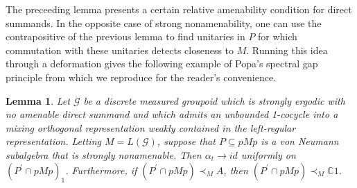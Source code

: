\documentclass[a4paper,11pt]{article}
\numberwithin{equation}{section}
\newtheorem{lem}[thm]{Lemma}
\theoremstyle{definition}
\theoremstyle{remark}
\numberwithin{equation}{section}
\newcommand{\rG}{\mathcal{G}}
\newcommand{\C}{\mathbb{C}}
\def\sub{\subseteq}
\numberwithin{equation}{section}
\begin{document}
The preceeding lemma presents a certain relative amenability condition for direct summands. In the opposite case of strong nonamenability, one can use the contrapositive of the previous lemma to find unitaries in $ P $ for which commutation with these unitaries detects closeness to $ M $. Running this idea through a deformation gives the following example of Popa's spectral gap principle from \cite{drimbe:21} which we reproduce for the reader's convenience.
\begin{lem}
    Let $\rG$ be a discrete measured groupoid which is strongly ergodic with no amenable direct summand and which admits an unbounded 1-cocycle into a mixing orthogonal representation weakly contained in the left-regular representation. Letting $ M = L(\rG) $, suppose that $ P\sub pMp $ is a von Neumann subalgebra that is strongly nonamenable. Then $ \alpha_{t}\to id $ uniformly on $ (P^{\prime}\cap pMp)_{1} $. Furthermore, if $ (P^{\prime}\cap pMp)\prec_{M} A $, then $ (P^{\prime}\cap pMp) \prec_{M} \C1 $. 
\end{lem}
\end{document}
